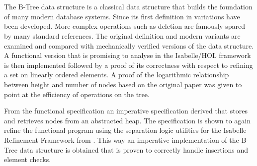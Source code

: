 \chapter{\abstractname}

The B-Tree data structure is a classical data structure
that builds the foundation of many modern database systems.
Since its first definition in \parencite{DBLP:journals/acta/BayerM72}
variations have been developed.
More complex operations such as deletion are famously spared by many
standard references.
The original definition and modern variants are examined and compared
with mechanically verified versions of the data structure.
A functional version that is promising to analyse in the Isabelle/HOL framework
is then implemented followed by a proof of its correctness with respect to refining
a set on linearly ordered elements.
A proof of the logarithmic relationship between height and number of nodes
based on the original paper was given to point at the efficiency of
operations on the tree.

From the functional specification an imperative specification
derived that stores and retrieves nodes from an abstracted heap.
The specification is shown to again refine the functional program
using the separation logic utilities for the Isabelle Refinement Framework from
\parencite{DBLP:journals/jar/Lammich19}.
This way an imperative implementation of the B-Tree data structure is obtained
that is proven to correctly handle insertions and element checks.




